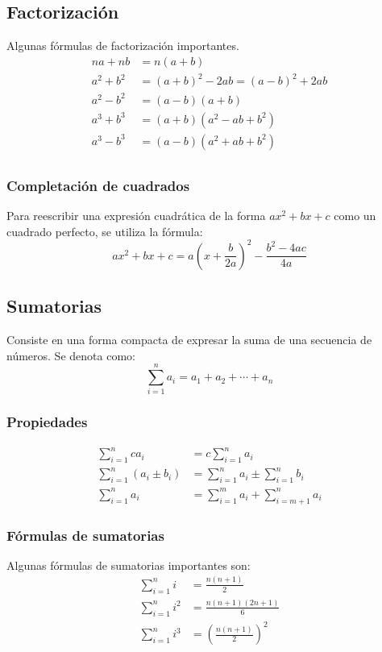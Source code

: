 \subsection{Factorización}
Algunas fórmulas de factorización importantes.
\begin{align*}
    na + nb &= n(a + b) \\
    a^2 + b^2 &=  {(a + b)}^2 - 2ab = {(a - b)}^2 + 2ab\\
    a^2 - b^2 &= (a - b)(a + b) \\
    a^3 + b^3 &= (a + b)(a^2 - ab + b^2) \\
    a^3 - b^3 &= (a - b)(a^2 + ab + b^2) \\
\end{align*}

\subsubsection{Completación de cuadrados}
Para reescribir una expresión cuadrática de la forma \(ax^2 + bx + c\) como un cuadrado perfecto, se utiliza la fórmula:
\[
    ax^2 + bx + c = a{\left(x + \frac{b}{2a}\right)}^2 - \frac{b^2 - 4ac}{4a}
\]

\subsection{Sumatorias}
Consiste en una forma compacta de expresar la suma de una secuencia de números. Se denota como:
\[
    \sum_{i = 1}^n a_i = a_1 + a_2 + \cdots + a_n
\]
\subsubsection{Propiedades}
\begin{align*}
    \sum_{i = 1}^n c a_i &= c \sum_{i = 1}^n a_i \\
    \sum_{i = 1}^n(a_i \pm b_i) &= \sum_{i = 1}^n a_i \pm \sum_{i = 1}^n b_i \\
    \sum_{i = 1}^n a_i &= \sum_{i = 1}^m a_i + \sum_{i = m + 1}^n a_i
\end{align*}

\subsubsection{Fórmulas de sumatorias}
Algunas fórmulas de sumatorias importantes son:
\begin{align*}
    \sum_{i = 1}^n i &= \frac{n(n + 1)}{2} \\
    \sum_{i = 1}^n i^2 &= \frac{n(n + 1)(2n + 1)}{6} \\
    \sum_{i = 1}^n i^3 &= {\left(\frac{n(n + 1)}{2}\right)}^2 \\
\end{align*}

